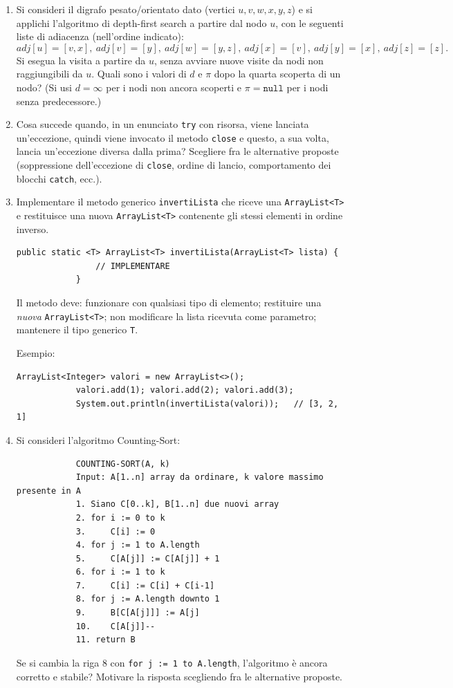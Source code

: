 \begin{enumerate}
		Esempio d'uso: \texttt{new StringEsame("B","A")} stampato deve dare \texttt{A;B}.
		
		Esempio:
		\begin{lstlisting}[style=java]
			StringEsame str = new StringEsame(null,"A");
			System.out.println(str);   // null;A
		\end{lstlisting}
		
		\item Si consideri il digrafo pesato/orientato dato (vertici $u,v,w,x,y,z$) e si applichi l'algoritmo di depth-first search a partire dal nodo $u$, con le seguenti liste di adiacenza (nell'ordine indicato):
		\[
		adj[u]=[v,x],\ adj[v]=[y],\ adj[w]=[y,z],\ adj[x]=[v],\ adj[y]=[x],\ adj[z]=[z].
		\]
		Si esegua la visita a partire da $u$, senza avviare nuove visite da nodi non raggiungibili da $u$. Quali sono i valori di $d$ e $\pi$ dopo la quarta scoperta di un nodo? (Si usi $d=\infty$ per i nodi non ancora scoperti e $\pi=\texttt{null}$ per i nodi senza predecessore.)
		
		\item Cosa succede quando, in un enunciato \texttt{try} con risorsa, viene lanciata un'eccezione, quindi viene invocato il metodo \texttt{close} e questo, a sua volta, lancia un'eccezione diversa dalla prima? Scegliere fra le alternative proposte (soppressione dell'eccezione di \texttt{close}, ordine di lancio, comportamento dei blocchi \texttt{catch}, ecc.).
		
		\item Implementare il metodo generico \texttt{invertiLista} che riceve una \texttt{ArrayList<T>} e restituisce una nuova \texttt{ArrayList<T>} contenente gli stessi elementi in ordine inverso.
		\begin{lstlisting}[style=java]
			public static <T> ArrayList<T> invertiLista(ArrayList<T> lista) {
				// IMPLEMENTARE
			}
		\end{lstlisting}
		Il metodo deve: funzionare con qualsiasi tipo di elemento; restituire una \emph{nuova} \texttt{ArrayList<T>}; non modificare la lista ricevuta come parametro; mantenere il tipo generico \texttt{T}.
		
		Esempio:
		\begin{lstlisting}[style=java]
			ArrayList<Integer> valori = new ArrayList<>();
			valori.add(1); valori.add(2); valori.add(3);
			System.out.println(invertiLista(valori));   // [3, 2, 1]
		\end{lstlisting}
		
		\item Si consideri l'algoritmo Counting-Sort:
		\begin{lstlisting}
			COUNTING-SORT(A, k)
			Input: A[1..n] array da ordinare, k valore massimo presente in A
			1. Siano C[0..k], B[1..n] due nuovi array
			2. for i := 0 to k
			3.     C[i] := 0
			4. for j := 1 to A.length
			5.     C[A[j]] := C[A[j]] + 1
			6. for i := 1 to k
			7.     C[i] := C[i] + C[i-1]
			8. for j := A.length downto 1
			9.     B[C[A[j]]] := A[j]
			10.    C[A[j]]--
			11. return B
		\end{lstlisting}
		Se si cambia la riga 8 con \texttt{for j := 1 to A.length}, l'algoritmo è ancora corretto e stabile? Motivare la risposta scegliendo fra le alternative proposte.
		

\end{enumerate}
